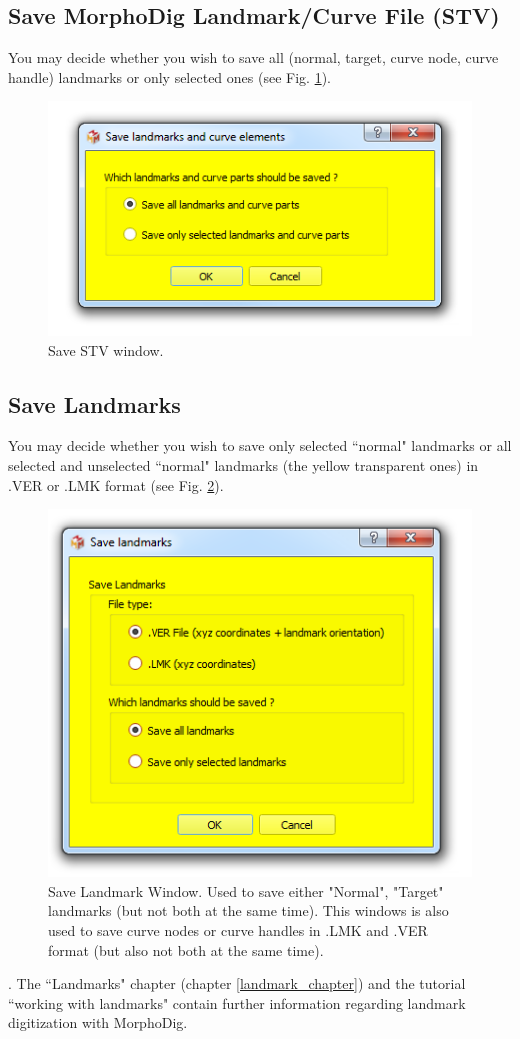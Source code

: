 \subsection{Save MorphoDig Landmark/Curve File (STV)}
You may decide whether you wish to save all (normal, target, curve node, curve handle) landmarks or only selected ones (see Fig. \ref{save_stv}).
\begin{figure}
  \centering
  \includegraphics[scale=0.5]{images/07/landmarks/save_stv.png}
 \caption{Save STV window.}
\label{save_stv}
\end{figure}

\subsection{Save Landmarks}
You may decide whether you wish to save only selected ``normal" landmarks or all selected and
unselected ``normal" landmarks (the yellow transparent ones) in .VER or .LMK format (see Fig. \ref{save_ver_lmk}).
\begin{figure}
  \centering
  \includegraphics[scale=0.5]{images/07/landmarks/save_ver_lmk.png}
 \caption{Save Landmark Window. Used to save either "Normal", "Target" landmarks (but not both at the same time). This windows is also used to save curve nodes or curve handles in .LMK and .VER format (but also not both at the same time). }
\label{save_ver_lmk}
\end{figure}.
The ``Landmarks" chapter (chapter \ref{landmark_chapter}) and the tutorial ``working with landmarks" contain further information regarding landmark digitization with MorphoDig.


